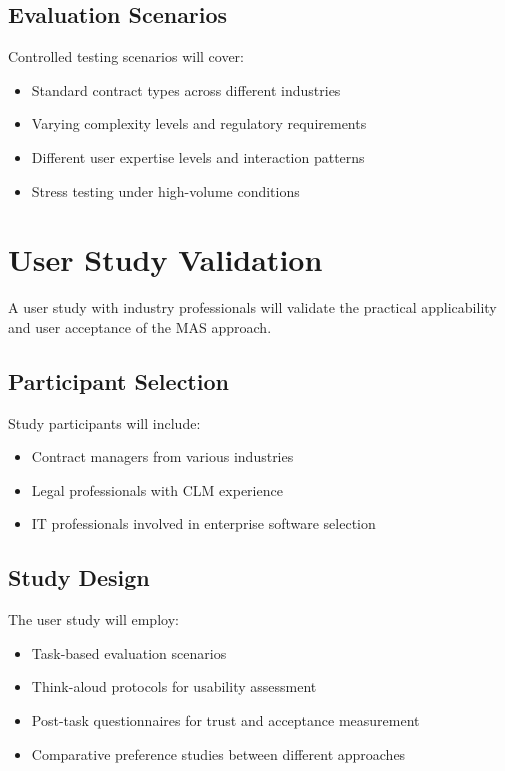 \subsection{Evaluation Scenarios}
Controlled testing scenarios will cover:
\begin{itemize}
    \item Standard contract types across different industries
    \item Varying complexity levels and regulatory requirements
    \item Different user expertise levels and interaction patterns
    \item Stress testing under high-volume conditions
\end{itemize}

\section{User Study Validation}

A user study with industry professionals will validate the practical applicability and user acceptance of the MAS approach.

\subsection{Participant Selection}
Study participants will include:
\begin{itemize}
    \item Contract managers from various industries
    \item Legal professionals with CLM experience
    \item IT professionals involved in enterprise software selection
\end{itemize}

\subsection{Study Design}
The user study will employ:
\begin{itemize}
    \item Task-based evaluation scenarios
    \item Think-aloud protocols for usability assessment
    \item Post-task questionnaires for trust and acceptance measurement
    \item Comparative preference studies between different approaches
\end{itemize}

